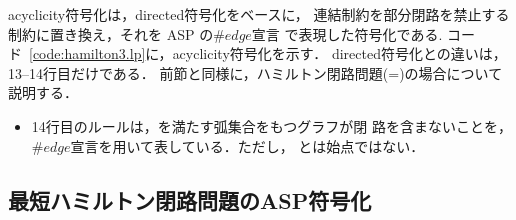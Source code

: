\textsf{acyclicity}符号化は，\textsf{directed}符号化をベースに，
連結制約を部分閉路を禁止する制約に置き換え，それを ASP の$\#edge$宣言
で表現した符号化である.
コード~\ref{code:hamilton3.lp}に，\textsf{acyclicity}符号化を示す．
\textsf{directed}符号化との違いは，13--14行目だけである．
前節と同様に，ハミルトン閉路問題(=)の場合について説明する．

\begin{itemize}
\item  14行目のルールは，を満たす弧集合をもつグラフが閉
  路を含まないことを，$\#edge$宣言を用いて表している．ただし，
  とは始点ではない．
\end{itemize}

\subsection{最短ハミルトン閉路問題のASP符号化}\label{minexpl}



